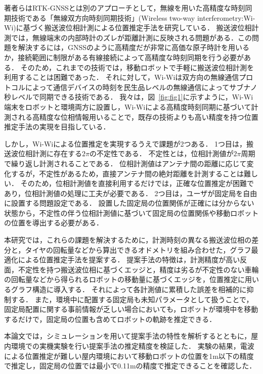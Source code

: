 \documentclass[a4jsme]{jsmepaper}
\newcommand\figref[1]{図~\ref{fig:#1}}
\begin{document}
著者らはRTK-GNSSとは別のアプローチとして，無線を用いた高精度な時刻同期技術である「無線双方向時刻同期技術」(Wireless two-way interferometry:Wi-Wi)\cite{Shiga2017,Yasuda2019}に基づく搬送波位相計測による位置推定手法を研究している．
搬送波位相計測では，無線端末の内部時計のズレが距離計測に反映される問題がある．この問題を解決するには，GNSSのように高精度だが非常に高価な原子時計を用いるか，接続範囲に制限がある有線接続によって高精度な時刻同期を行う必要がある．
そのため，これまでの技術では，移動ロボットで手軽に搬送波位相計測を利用することは困難であった．
それに対して，Wi-Wiは双方向の無線通信プロトコルによって通信デバイスの時刻を民生品レベルの無線通信によってサブナノ秒レベルで同期できる技術である．
我々は，\figref{fig1}に示すように，Wi-Wi端末をロボットと環境両方に設置し，Wi-Wiによる高精度時刻同期に基づいて計測される高精度な位相情報用いることで，既存の技術よりも高い精度を持つ位置推定手法の実現を目指している．

しかし，Wi-Wiによる位置推定を実現するうえで課題が2つある．
1つ目は，搬送波位相計測に存在する$2\pi$の不定性である．
不定性とは，位相計測値が$2\pi$周期で繰り返し計測されることである．
位相計測値はアンテナ間の距離に応じて変化するが，不定性があるため，直接アンテナ間の絶対距離を計測することは難しい．
そのため，位相計測値を直接利用するだけでは，正確な位置推定が困難であり，位相計測値の処理に工夫が必要である．
2つ目は，ユーザが固定局を自由に設置する問題設定である．
設置した固定局の位置関係が正確には分からない状態から，不定性の伴う位相計測値に基づいて固定局の位置関係や移動ロボットの位置を導出する必要がある．

本研究では，これらの課題を解決するために，計測時刻の異なる搬送波位相の差分と，タイヤの回転量などから算出できるオドメトリを組み合わせた，グラフ最適化による位置推定手法を提案する．
提案手法の特徴は，計測精度が高い反面，不定性を持つ搬送波位相に基づくエッジと，精度は劣るが不定性のない車輪の回転量などから得られるロボットの移動量に基づくエッジを，位置推定に用いるグラフ構造に導入する．
それによって各計測値に累積した誤差を相補的に抑制する．
また，環境中に配置する固定局も未知パラメータとして扱うことで，固定局配置に関する事前情報が乏しい場合においても，ロボットが環境中を移動するだけで，固定局の位置も含めてロボットの軌跡を推定できる．

本論文では，シミュレーションを用いて提案手法の特性を解析するとともに，屋内環境での実機実験を行い提案手法の推定精度を検証した．
実験の結果，電波による位置推定が難しい屋内環境において移動ロボットの位置を1m以下の精度で推定し，固定局の位置では最小で0.11mの精度で推定できることを確認した．
\end{document}
